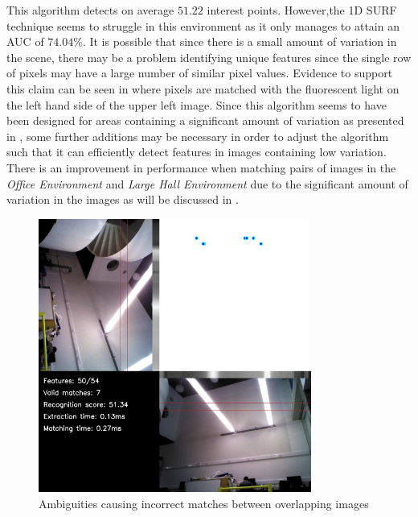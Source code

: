 This algorithm detects on average $51.22$ interest points. However,the 1D SURF technique seems to struggle in this environment as it only manages to attain an AUC of $74.04\%$. It is possible that since there is a small amount of variation in the scene, there may be a problem identifying unique features since the single row of pixels may have a large number of similar pixel values. Evidence to support this claim can be seen in  where pixels are matched with the fluorescent light on the left hand side of the upper left image. Since this algorithm seems to have been designed for areas containing a significant amount of variation as presented in \citep{Anderson}, some further additions may be necessary in order to adjust the algorithm such that it can efficiently detect features in images containing low variation. There is an improvement in performance when matching pairs of images in the \textit{Office Environment} and \textit{Large Hall Environment} due to the significant amount of variation in the images as will be discussed in .\\

\begin{figure}
  \centering
    \includegraphics[width=0.8\textwidth]{../Drawings/Matching/nonmatching.jpg}
    \caption{Ambiguities causing incorrect matches between overlapping images} 
    \label{fig:ambiguities}
\end{figure}



